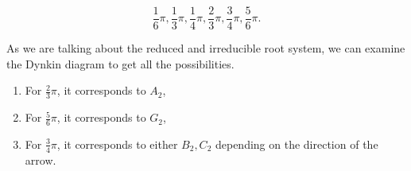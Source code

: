 \documentclass{article}
\numberwithin{equation}{section}
\begin{document}
\begin{equation*}
{\frac {1} {6}}\pi,{\frac {1} {3}}\pi,{\frac {1} {4}}\pi,{\frac {2} {3}}\pi,{\frac {3} {4}}\pi,{\frac {5} {6}}\pi.
\end{equation*}

As we are talking about the reduced and irreducible root system, we can examine the Dynkin diagram to get all the possibilities.

\begin{enumerate}
\item For ${\frac 2 3}\pi$, it corresponds to $A_2$,
\item For ${\frac 5 6}\pi$, it corresponds to $G_2$,
\item For ${\frac 3 4}\pi$, it corresponds to either $B_2,C_2$ depending on the direction of the arrow.
\end{enumerate}
\end{document}
